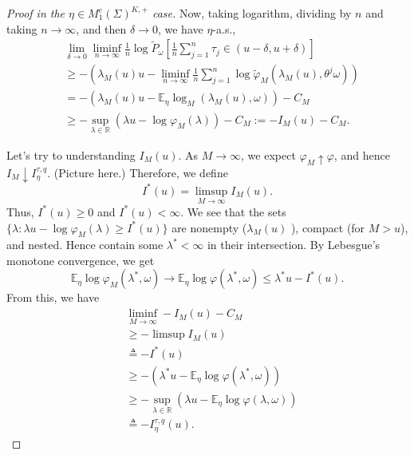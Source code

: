 \begin{proof}[Proof in the $\eta \in M_1^e(\Sigma)^{K, +}$ case]
	Now, taking logarithm, dividing by $n$ and taking $n \to \infty $, and then $\delta \to 0$, we have $\eta$-a.s.,
	\begin{align*}
		&\lim_{\delta \to 0} \liminf_{n \to \infty } \frac{1}{n} \log \tilde P_\omega \left[ \frac{1}{n} \sum_{j=1}^{n} \tau_j \in  (u - \delta, u + \delta) \right] \\
		& \ge -\left(\lambda_M(u) u-\liminf _{n \rightarrow \infty} \frac{1}{n} \sum_{j=1}^n \log \tilde{\varphi}_M\left(\lambda_M(u), \theta^j \omega\right)\right) \\
		&= - \left( \lambda_M(u) u - \mathbb{E}_ \eta \log_M(\lambda_M(u), \omega)\right)  - C_M \\
		&\ge  - \sup _{\lambda \in \mathbb{R}} (\lambda u -\log \varphi_M(\lambda)) - C_M := - I_M(u) - C_M
	.\end{align*}

	Let's try to understanding $I_M(u)$. As $M \to \infty $, we expect  $\varphi_M \uparrow \varphi$, and hence $I_M \downarrow I_\eta ^{\tau, q}$. (Picture here.) Therefore, we define
	\[
		I^*(u) = \limsup _{M \to \infty } I_M(u)
	.\] 
	Thus, $I^*(u) \ge 0$ and $I^*(u) < \infty $. We see that the sets $\{\lambda: \lambda u - \log \varphi_M(\lambda) \ge I^*(u)\} $ are nonempty ($\lambda_M(u)$ ), compact (for $M > u$), and nested. Hence contain some $\lambda^* < \infty $ in their intersection. By Lebesgue's monotone convergence, we get
	\[
		\mathbb{E}_ \eta \log \varphi_M(\lambda^*, \omega) \to \mathbb{E}_ \eta \log \varphi(\lambda^*, \omega) \le  \lambda^* u - I^*(u)
	.\] 
	From this, we have
	\begin{align*}
		& \liminf_{M \to \infty } - I_M(u) - C_M\\
		&\geq - \limsup I_M(u) \\
		&\triangleq - I^*(u) \\
		&\geq - \left( \lambda^* u - \mathbb{E}_ \eta \log \varphi(\lambda^*, \omega)\right) \\
		&\geq - \sup _{\lambda \in \mathbb{R}}\left( \lambda u - \mathbb{E}_ \eta \log \varphi(\lambda, \omega)\right) \\
		&\triangleq - I_ \eta^{\tau, q}(u)
	.\end{align*}

\end{proof}


